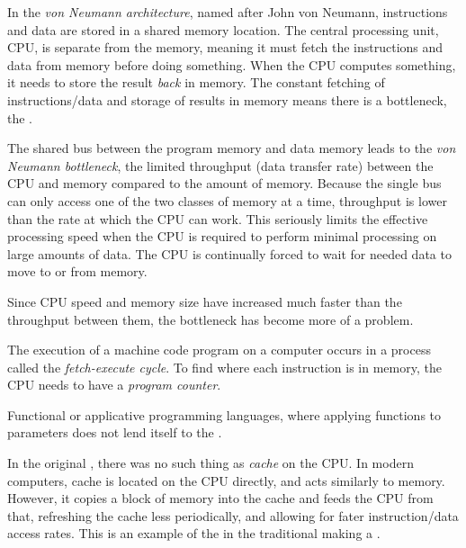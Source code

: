 \begin{definition}\label{def:von_Neumann_Architecture}
  In the \emph{von Neumann architecture}, named after John von Neumann, instructions and data are stored in a shared memory location.
  The central processing unit, CPU, is separate from the memory, meaning it must fetch the instructions and data from memory before doing something.
  When the CPU computes something, it needs to store the result \emph{back} in memory.
  The constant fetching of instructions/data and storage of results in memory means there is a bottleneck, the \emph{}.

  \begin{remark}\label{rmk:von_Neumann_Bottleneck}
    The shared bus between the program memory and data memory leads to the \emph{von Neumann bottleneck}, the limited throughput (data transfer rate) between the CPU and memory compared to the amount of memory.
    Because the single bus can only access one of the two classes of memory at a time, throughput is lower than the rate at which the CPU can work.
    This seriously limits the effective processing speed when the CPU is required to perform minimal processing on large amounts of data. The CPU is continually forced to wait for needed data to move to or from memory.

    Since CPU speed and memory size have increased much faster than the throughput between them, the bottleneck has become more of a problem.
  \end{remark}

  The execution of a machine code program on a  computer occurs in a process called the \emph{fetch-execute cycle}.
  To find where each instruction is in memory, the CPU needs to have a \emph{program counter}.

  Functional or applicative programming languages, where applying functions to parameters does not lend itself to the .

  \begin{remark}
    In the original , there was no such thing as \emph{cache} on the CPU.\@
    In modern computers, cache is located on the CPU directly, and acts similarly to memory.
    However, it copies a block of memory into the cache and feeds the CPU from that, refreshing the cache less periodically, and allowing for fater instruction/data access rates.
    This is an example of the  in the traditional  making a .
  \end{remark}


\end{definition}
